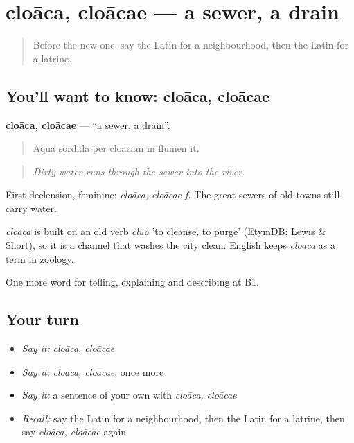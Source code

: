 \section[cloāca, cloācae]{cloāca, cloācae — a sewer, a drain}

\label{lesson:LA-C458-cloaca}



\begin{quote}
Before the new one: say the Latin for a neighbourhood, then the Latin for a latrine.
\end{quote}

\subsection*{You'll want to know: cloāca, cloācae}
\textbf{cloāca, cloācae} — \textquotedblleft{}a sewer, a drain\textquotedblright{}.

\begin{quote}
Aqua sordida per cloācam in flūmen it.
\end{quote}

\begin{quote}
\emph{Dirty water runs through the sewer into the river.}
\end{quote}

First declension, feminine: \emph{cloāca, cloācae f.} The great sewers of old towns still carry water.

\begin{cousinweb}
\emph{cloāca} is built on an old verb \emph{cluō} 'to cleanse, to purge' (EtymDB; Lewis \& Short), so it is a channel that washes the city clean. English keeps \emph{cloaca} as a term in zoology.
\end{cousinweb}

\begin{grammarlens}[title={What you've built}]
One more word for telling, explaining and describing at B1.
\end{grammarlens}

\subsection*{Your turn}
\begin{itemize}
\raggedright
  \item \emph{Say it:} \emph{cloāca, cloācae}
  \item \emph{Say it:} \emph{cloāca, cloācae}, once more
  \item \emph{Say it:} a sentence of your own with \emph{cloāca, cloācae}
  \item \emph{Recall:} say the Latin for a neighbourhood, then the Latin for a latrine, then say \emph{cloāca, cloācae} again
\end{itemize}

